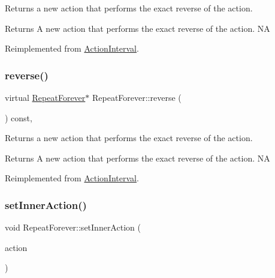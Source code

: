 Returns a new action that performs the exact reverse of the action.

\begin{DoxyReturn}{Returns}
A new action that performs the exact reverse of the action.  NA 
\end{DoxyReturn}


Reimplemented from \hyperlink{classActionInterval_a9f9ac7164036a0bc261a72f62a2b2da7}{Action\+Interval}.

\mbox{\label{classRepeatForever_a28dd8c54ad7f874f7f8f593b21969766}} 
\subsubsection{\texorpdfstring{reverse()}{reverse()}\hspace{0.1cm}{\footnotesize\ttfamily [2/2]}}
{\footnotesize\ttfamily virtual \hyperlink{classRepeatForever}{Repeat\+Forever}$\ast$ Repeat\+Forever\+::reverse (\begin{DoxyParamCaption}\item[{void}]{ }\end{DoxyParamCaption}) const\hspace{0.3cm}{\ttfamily [override]}, {\ttfamily [virtual]}}

Returns a new action that performs the exact reverse of the action.

\begin{DoxyReturn}{Returns}
A new action that performs the exact reverse of the action.  NA 
\end{DoxyReturn}


Reimplemented from \hyperlink{classActionInterval_a9f9ac7164036a0bc261a72f62a2b2da7}{Action\+Interval}.

\mbox{\label{classRepeatForever_a7f8ea33f8ff4be43698d4bfdeab38c83}} 
\subsubsection{\texorpdfstring{set\+Inner\+Action()}{setInnerAction()}\hspace{0.1cm}{\footnotesize\ttfamily [1/2]}}
{\footnotesize\ttfamily void Repeat\+Forever\+::set\+Inner\+Action (\begin{DoxyParamCaption}\item[{\hyperlink{classActionInterval}{Action\+Interval} $\ast$}]{action }\end{DoxyParamCaption})\hspace{0.3cm}{\ttfamily [inline]}}

